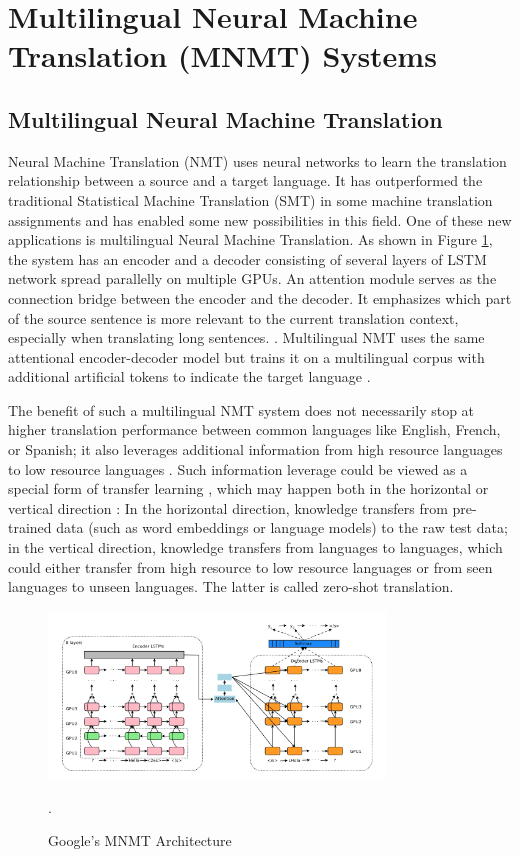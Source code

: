 \documentclass[thesis,fonts=libertine]{cluu}
\begin{document}
\section{Multilingual Neural Machine Translation (MNMT) Systems}

\subsection{Multilingual Neural Machine Translation}

Neural Machine Translation (NMT) uses neural networks to learn the translation relationship between a source and a target language. It has outperformed the traditional Statistical Machine Translation (SMT) in some machine translation assignments and has enabled some new possibilities in this field. One of these new applications is multilingual Neural Machine Translation. As shown in Figure \ref{fig:google_mnmt}, the system has an encoder and a decoder consisting of several layers of LSTM network spread parallelly on multiple GPUs. An attention module serves as the connection bridge between the encoder and the decoder. It emphasizes which part of the source sentence is more relevant to the current translation context, especially when translating long sentences. \parencite{Wu:2016aa}. Multilingual NMT uses the same attentional encoder-decoder model but trains it on a multilingual corpus with additional artificial tokens to indicate the target language \parencite{Johnson:2016aa}.

The benefit of such a multilingual NMT system does not necessarily stop at higher translation performance between common languages like English, French, or Spanish; it also leverages additional information from high resource languages to low resource languages \parencite{Zoph:2016aa}. Such information leverage could be viewed as a special form of transfer learning \parencite{Zoph:2016aa}, which may happen both in the horizontal or vertical direction \parencite{Lakew:2019aa}: In the horizontal direction, knowledge transfers from pre-trained data (such as word embeddings or language models) to the raw test data; in the vertical direction, knowledge transfers from languages to languages, which could either transfer from high resource to low resource languages or from seen languages to unseen languages. The latter is called zero-shot translation.

\begin{figure}
  \centering
  \includegraphics[width=0.8\textwidth]{google_mnmt_architecture.png}
  \caption{Google's MNMT Architecture \parencite{Johnson:2016aa,Wu:2016aa}}.
  \label{fig:google_mnmt}
\end{figure}
\end{document}

